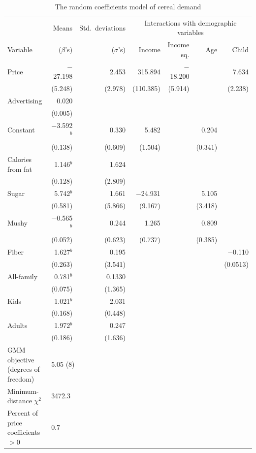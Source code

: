 \begin{table}[htbp]
\centering
\caption{The random coefficients model of cereal demand}
\label{tab:08-nevo-full}
\footnotesize
\begin{tabular}{@{}lrrrrrr@{}}
\toprule
 & Means & Std.\ deviations & \multicolumn{4}{c}{Interactions with demographic variables} \\
\cmidrule(l){4-7}
Variable & ($\beta$'s) & ($\sigma$'s) & Income & Income sq. & Age & Child \\
\midrule
Price & $-$27.198 & 2.453 & 315.894 & $-$18.200 & & 7.634 \\
 & (5.248) & (2.978) & (110.385) & (5.914) & & (2.238) \\
Advertising & 0.020 & & & & & \\
 & (0.005) & & & & & \\
Constant & $-$3.592$^{b}$ & 0.330 & 5.482 & & 0.204 & \\
 & (0.138) & (0.609) & (1.504) & & (0.341) & \\
Calories from fat & 1.146$^{b}$ & 1.624 & & & & \\
 & (0.128) & (2.809) & & & & \\
Sugar & 5.742$^{b}$ & 1.661 & $-$24.931 & & 5.105 & \\
 & (0.581) & (5.866) & (9.167) & & (3.418) & \\
Mushy & $-$0.565$^{b}$ & 0.244 & 1.265 & & 0.809 & \\
 & (0.052) & (0.623) & (0.737) & & (0.385) & \\
Fiber & 1.627$^{b}$ & 0.195 & & & & $-$0.110 \\
 & (0.263) & (3.541) & & & & (0.0513) \\
All-family & 0.781$^{b}$ & 0.1330 & & & & \\
 & (0.075) & (1.365) & & & & \\
Kids & 1.021$^{b}$ & 2.031 & & & & \\
 & (0.168) & (0.448) & & & & \\
Adults & 1.972$^{b}$ & 0.247 & & & & \\
 & (0.186) & (1.636) & & & & \\
\midrule
GMM objective (degrees of freedom) & \multicolumn{6}{l}{5.05 (8)} \\
Minimum-distance $\chi^2$ & \multicolumn{6}{l}{3472.3} \\
Percent of price coefficients $> 0$ & \multicolumn{6}{l}{0.7} \\
\bottomrule
\end{tabular}


\end{table}

